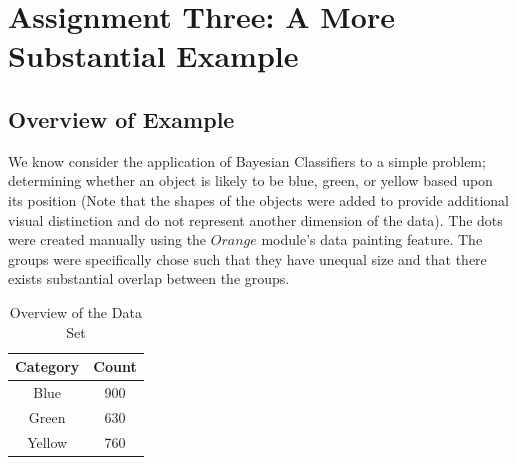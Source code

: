 
\graphicspath{{C:/Local_Files/GitHub/MCS507_Final_Project/tex/include/}}

\section{Assignment Three: A More Substantial Example} %
\subsection{Overview of Example} %
\begin{flushleft}We know consider the application of Bayesian Classifiers to a simple problem; determining whether an object is likely to be blue, green, or yellow based upon its position (Note that the shapes of the objects were added to provide additional visual distinction and do not represent another dimension of the data). The dots were created manually using the $Orange$ module's data painting feature. The groups were specifically chose such that they have unequal size and that there exists substantial overlap between the groups. 
\end{flushleft}

\begin{table}[H]
\caption{Overview of the Data Set}
\centering
\begin{tabular}{c c}
\hline\hline
Category & Count \\
\hline
Blue & 900 \\
Green & 630 \\
Yellow & 760 \\
\hline
\end{tabular}
\label{table:nonlin} 
\end{table}


